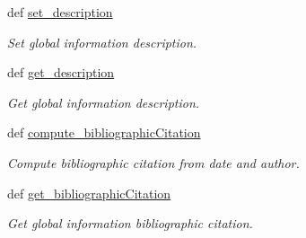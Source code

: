 \begin{DoxyCompactItemize}
def \hyperlink{classlmf_1_1src_1_1core_1_1global__information_1_1_global_information_a9e6b98762af2465bf4babfa87bbd5ee8}{set\+\_\+description}
\begin{DoxyCompactList}\small\item\em Set global information description. \end{DoxyCompactList}\item 
def \hyperlink{classlmf_1_1src_1_1core_1_1global__information_1_1_global_information_af9c9b2b792546ea670838383492438f5}{get\+\_\+description}
\begin{DoxyCompactList}\small\item\em Get global information description. \end{DoxyCompactList}\item 
def \hyperlink{classlmf_1_1src_1_1core_1_1global__information_1_1_global_information_ac7395a0960ac17fb5a5d79b8dba66191}{compute\+\_\+bibliographic\+Citation}
\begin{DoxyCompactList}\small\item\em Compute bibliographic citation from date and author. \end{DoxyCompactList}\item 
def \hyperlink{classlmf_1_1src_1_1core_1_1global__information_1_1_global_information_a77753be672eef5626bd6c8deaa157a16}{get\+\_\+bibliographic\+Citation}
\begin{DoxyCompactList}\small\item\em Get global information bibliographic citation. \end{DoxyCompactList}\end{DoxyCompactItemize}
